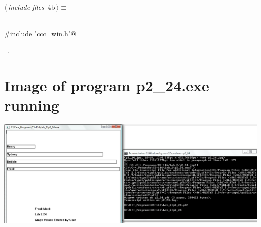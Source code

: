 \documentclass{article}
\begin{document}
\begin{flushleft} \small
\begin{minipage}{\linewidth}\label{scrap6}\raggedright\small
{} $\langle\,${\it include files}\nobreak\ {\footnotesize {4b}}$\,\rangle\equiv$
\vspace{-1ex}
\begin{list}{}{} \item
\mbox{}\verb@@\\
\mbox{}\verb@#include "ccc_win.h"@\\
\mbox{}\verb@@{\NWsep}
\end{list}
\vspace{-1.5ex}
\footnotesize
\begin{list}{}{\setlength{\itemsep}{-\parsep}\setlength{\itemindent}{-\leftmargin}}
\item \NWtxtMacroRefIn\ .

\item{}
\end{list}
\end{minipage}\vspace{4ex}
\end{flushleft}
\section{Image of program p2\_24.exe running}
\includegraphics[width=18cm]{p2_24.jpg}
\end{document}
